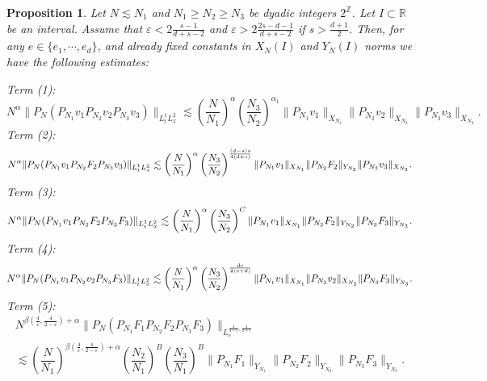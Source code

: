\documentclass[aihp]{imsart}
\numberwithin{equation}{section}
\theoremstyle{plain}
\newtheorem{prop}[thm]{Proposition}
\theoremstyle{remark}
\newcommand{\R}{\mathbb{R}}
\newcommand{\Z}{\mathbb{Z}}
\begin{document}
\begin{prop}
\label{mainpropnonlinear}
Let $N \lesssim N_1 $ and $N_1 \geq N_2 \geq N_3$ be dyadic integers $2^{\Z}$. Let $I \subset \R$ be an interval. Assume that $\varepsilon < 2\frac{s-1}{d+s-2}$ and $\varepsilon>2 \frac{2s-d-1}{d+s-2}$ if $s>\frac{d+1}{2}$. Then, for any $e\in \{e_1, \cdots , e_d\}$, and already fixed constants in $X_N(I)$ and $Y_N(I)$ norms we have the following estimates:

\noindent
Term (1):
\begin{equation*}
N^\alpha \|P_N (P_{N_1} v_1 P_{N_2} v_2 P_{N_3}v_3)\|_{L^1_t L_x^2}
\lesssim \left(\dfrac{N}{N_1}\right)^{\alpha} \left(\dfrac{N_3}{N_2}\right)^{\alpha_1} \|P_{N_1}v_1\|_{X_{N_1}}\|P_{N_2}v_2\|_{X_{N_2}} \|P_{N_3}v_3\|_{X_{N_3}}. 
\end{equation*}
\noindent
Term (2):
\begin{equation*}
N^\alpha \|P_N (P_{N_1} v_1 P_{N_2} F_2 P_{N_3}v_3)\|_{L^1_t L_x^2}\\
\lesssim \left(\dfrac{N}{N_1}\right)^{\alpha} \left(\frac{N_3}{N_2} \right)^{\frac{(d-s)s}{4(d+s)}}  \|P_{N_1}v_1\|_{X_{N_1}}\|P_{N_2}F_2\|_{Y_{N_2}} \|P_{N_3}v_3\|_{X_{N_3}}. 
\end{equation*}
\noindent
Term (3):
\begin{equation*}
N^\alpha \|P_N (P_{N_1} v_1 P_{N_2} F_2 P_{N_3}F_3)\|_{L^1_t L_x^2}\\
\lesssim \left(\dfrac{N}{N_1}\right)^{\alpha} \left(\dfrac{N_3}{N_2}\right)^{C} \|P_{N_1}v_1\|_{X_{N_1}}\|P_{N_2}F_2\|_{Y_{N_2}} \|P_{N_3}F_3\|_{Y_{N_3}}. 
\end{equation*}
\noindent
Term (4):
\begin{equation*}
N^\alpha \|P_N (P_{N_1} v_1 P_{N_2} v_2 P_{N_3}F_3)\|_{L^1_t L_x^2}\\
\lesssim \left(\dfrac{N}{N_1}\right)^{\alpha} \left(\dfrac{N_3}{N_2}\right)^{\frac{ds}{2(s+d)}} \|P_{N_1}v_1\|_{X_{N_1}}\|P_{N_2}v_2\|_{X_{N_2}} \|P_{N_3}F_3\|_{Y_{N_3}}. 
\end{equation*}
\noindent
Term (5):
\begin{multline*}
N^{\beta (\frac{4}{\varepsilon},\frac{4}{2-\varepsilon}) +\alpha} \|P_N (P_{N_1} F_1 P_{N_2} F_2 P_{N_3} F_3) \|_{L_e^{\frac{4}{4-\varepsilon} , \frac{4}{2+\varepsilon}} }\\
 \lesssim \left(\dfrac{N}{N_1}\right)^{\beta  (\frac{4}{\varepsilon},\frac{4}{2-\varepsilon})+ \alpha} \left(\dfrac{N_2}{N_1}\right)^B \left(\dfrac{N_3}{N_1}\right)^{B} 
 \|P_{N_1}F_1\|_{Y_{N_1}}\|P_{N_2}F_2\|_{Y_{N_2}} \|P_{N_3}F_3\|_{Y_{N_3}}.  

\end{multline*}
\end{prop}
\end{document}
